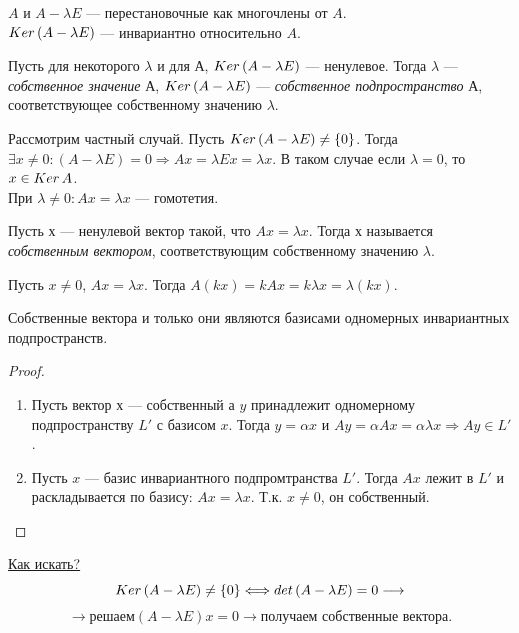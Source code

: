$A$ и $A - \lambda E$ --- перестановочные как многочлены от $A$.\\

$Ker\thinspace(A - \lambda E)$ --- инвариантно относительно $A$.\\

\begin{definition}
    Пусть для некоторого $\lambda$ и для А, $Ker\thinspace(A - \lambda E)$ --- ненулевое. Тогда $\lambda$ --- \textit{собственное значение} А, $Ker\thinspace(A - \lambda E)$ --- \textit{собственное подпространство} А, соответствующее собственному значению $\lambda$.
\end{definition}

Рассмотрим частный случай. Пусть $Ker\thinspace (A - \lambda E) \neq \{0\}$. Тогда $\exists x \neq 0 : (A - \lambda E) = 0 \Longrightarrow Ax = \lambda Ex = \lambda x$. В таком случае если $\lambda = 0$, то $x \in Ker\thinspace A$.\\
При $\lambda \neq 0 : Ax = \lambda x$ --- гомотетия.

\begin{definition}
    Пусть х --- ненулевой вектор такой, что $Ax = \lambda x$. Тогда х называется \textit{собственным вектором}, соответствующим собственному значению $\lambda$.
\end{definition}

Пусть $x \neq 0$, $Ax = \lambda x$. Тогда $A(kx) = kAx = k\lambda x = \lambda(kx)$.

\begin{theorem}
    Собственные вектора и только они являются базисами одномерных инвариантных подпространств.
\end{theorem}
\begin{proof}
    \tab\\
    \begin{enumerate}
        \item Пусть вектор х --- собственный а $y$ принадлежит одномерному подпространству  $L'$ с базисом $x$. Тогда $y = \alpha x$ и $Ay = \alpha Ax = \alpha\lambda x \Longrightarrow Ay \in L'$.
        \item Пусть $x$ --- базис инвариантного подпромтранства $L'$. Тогда $Ax$ лежит в $L'$ и раскладывается по базису: $Ax = \lambda x$. Т.к. $x \neq 0$, он собственный.
    \end{enumerate}
\end{proof}

\underline{Как искать?}\\
\[
Ker\thinspace(A - \lambda E) \neq \{0\} \Longleftrightarrow det\thinspace(A - \lambda E) = 0 \longrightarrow
\]
\[
\longrightarrow \text{решаем} (A - \lambda E)x = 0 \longrightarrow \text{получаем собственные вектора.}
\]

